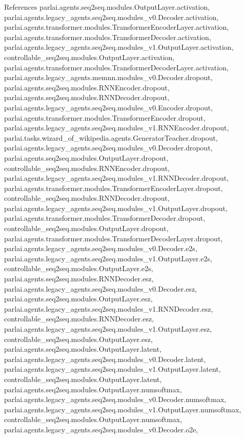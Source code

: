 References parlai.\+agents.\+seq2seq.\+modules.\+Output\+Layer.\+activation, parlai.\+agents.\+legacy\+\_\+agents.\+seq2seq.\+modules\+\_\+v0.\+Decoder.\+activation, parlai.\+agents.\+transformer.\+modules.\+Transformer\+Encoder\+Layer.\+activation, parlai.\+agents.\+transformer.\+modules.\+Transformer\+Decoder.\+activation, parlai.\+agents.\+legacy\+\_\+agents.\+seq2seq.\+modules\+\_\+v1.\+Output\+Layer.\+activation, controllable\+\_\+seq2seq.\+modules.\+Output\+Layer.\+activation, parlai.\+agents.\+transformer.\+modules.\+Transformer\+Decoder\+Layer.\+activation, parlai.\+agents.\+legacy\+\_\+agents.\+memnn.\+modules\+\_\+v0.\+Decoder.\+dropout, parlai.\+agents.\+seq2seq.\+modules.\+R\+N\+N\+Encoder.\+dropout, parlai.\+agents.\+seq2seq.\+modules.\+R\+N\+N\+Decoder.\+dropout, parlai.\+agents.\+legacy\+\_\+agents.\+seq2seq.\+modules\+\_\+v0.\+Encoder.\+dropout, parlai.\+agents.\+transformer.\+modules.\+Transformer\+Encoder.\+dropout, parlai.\+agents.\+legacy\+\_\+agents.\+seq2seq.\+modules\+\_\+v1.\+R\+N\+N\+Encoder.\+dropout, parlai.\+tasks.\+wizard\+\_\+of\+\_\+wikipedia.\+agents.\+Generator\+Teacher.\+dropout, parlai.\+agents.\+legacy\+\_\+agents.\+seq2seq.\+modules\+\_\+v0.\+Decoder.\+dropout, parlai.\+agents.\+seq2seq.\+modules.\+Output\+Layer.\+dropout, controllable\+\_\+seq2seq.\+modules.\+R\+N\+N\+Encoder.\+dropout, parlai.\+agents.\+legacy\+\_\+agents.\+seq2seq.\+modules\+\_\+v1.\+R\+N\+N\+Decoder.\+dropout, parlai.\+agents.\+transformer.\+modules.\+Transformer\+Encoder\+Layer.\+dropout, controllable\+\_\+seq2seq.\+modules.\+R\+N\+N\+Decoder.\+dropout, parlai.\+agents.\+legacy\+\_\+agents.\+seq2seq.\+modules\+\_\+v1.\+Output\+Layer.\+dropout, parlai.\+agents.\+transformer.\+modules.\+Transformer\+Decoder.\+dropout, controllable\+\_\+seq2seq.\+modules.\+Output\+Layer.\+dropout, parlai.\+agents.\+transformer.\+modules.\+Transformer\+Decoder\+Layer.\+dropout, parlai.\+agents.\+legacy\+\_\+agents.\+seq2seq.\+modules\+\_\+v0.\+Decoder.\+e2s, parlai.\+agents.\+legacy\+\_\+agents.\+seq2seq.\+modules\+\_\+v1.\+Output\+Layer.\+e2s, controllable\+\_\+seq2seq.\+modules.\+Output\+Layer.\+e2s, parlai.\+agents.\+seq2seq.\+modules.\+R\+N\+N\+Decoder.\+esz, parlai.\+agents.\+legacy\+\_\+agents.\+seq2seq.\+modules\+\_\+v0.\+Decoder.\+esz, parlai.\+agents.\+seq2seq.\+modules.\+Output\+Layer.\+esz, parlai.\+agents.\+legacy\+\_\+agents.\+seq2seq.\+modules\+\_\+v1.\+R\+N\+N\+Decoder.\+esz, controllable\+\_\+seq2seq.\+modules.\+R\+N\+N\+Decoder.\+esz, parlai.\+agents.\+legacy\+\_\+agents.\+seq2seq.\+modules\+\_\+v1.\+Output\+Layer.\+esz, controllable\+\_\+seq2seq.\+modules.\+Output\+Layer.\+esz, parlai.\+agents.\+seq2seq.\+modules.\+Output\+Layer.\+latent, parlai.\+agents.\+legacy\+\_\+agents.\+seq2seq.\+modules\+\_\+v0.\+Decoder.\+latent, parlai.\+agents.\+legacy\+\_\+agents.\+seq2seq.\+modules\+\_\+v1.\+Output\+Layer.\+latent, controllable\+\_\+seq2seq.\+modules.\+Output\+Layer.\+latent, parlai.\+agents.\+seq2seq.\+modules.\+Output\+Layer.\+numsoftmax, parlai.\+agents.\+legacy\+\_\+agents.\+seq2seq.\+modules\+\_\+v0.\+Decoder.\+numsoftmax, parlai.\+agents.\+legacy\+\_\+agents.\+seq2seq.\+modules\+\_\+v1.\+Output\+Layer.\+numsoftmax, controllable\+\_\+seq2seq.\+modules.\+Output\+Layer.\+numsoftmax, parlai.\+agents.\+legacy\+\_\+agents.\+seq2seq.\+modules\+\_\+v0.\+Decoder.\+o2e, 